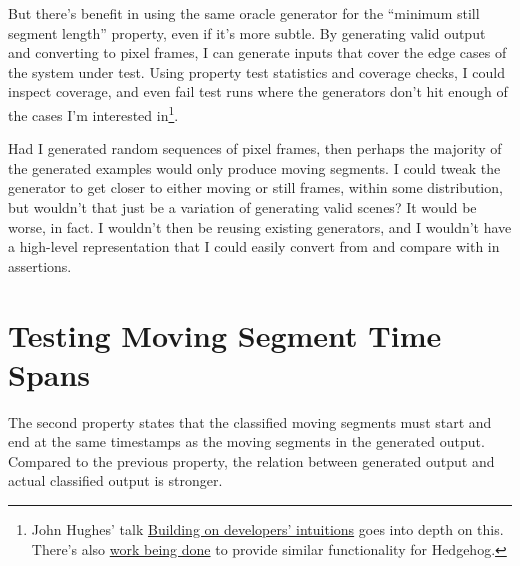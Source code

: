 But there's benefit in using the same oracle generator for the ``minimum still segment length'' property, even if it's more subtle. By generating valid output and converting to pixel frames, I can generate inputs that cover the edge cases of the system under test. Using property test statistics and coverage checks, I could inspect coverage, and even fail test runs where the generators don't hit enough of the cases I'm interested in\footnote{John Hughes' talk \href{https://www.youtube.com/watch?v=NcJOiQlzlXQ}{Building on developers' intuitions} goes into depth on this. There's also \href{https://github.com/hedgehogqa/haskell-hedgehog/pull/253}{work being done} to provide similar functionality for Hedgehog.}.

Had I generated random sequences of pixel frames, then perhaps the majority of the generated examples would only produce moving segments. I could tweak the generator to get closer to either moving or still frames, within some distribution, but wouldn't that just be a variation of generating valid scenes? It would be worse, in fact. I wouldn't then be reusing existing generators, and I wouldn't have a high-level representation that I could easily convert from and compare with in assertions.


\section{Testing Moving Segment Time Spans}


The second property states that the classified moving segments must start and end at the same timestamps as the moving segments in the generated output. Compared to the previous property, the relation between generated output and actual classified output is stronger.

